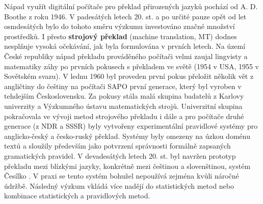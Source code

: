 \begin{multicols}{2}
Nápad využít digitální počítače pro překlad přirozených jazyků pochází od A. D. Boothe z roku 1946. V padesátých letech 20. st. a po určité pauze opět od let osmdesátých bylo do tohoto směru výzkumu investováno značné množství prostředků. I přesto \textbf{strojový překlad} (machine translation, MT) dodnes nesplňuje vysoká očekávání, jak byla formulována v prvních letech.
Na území České republiky nápad překladu prováděného počítači velmi zaujal lingvisty a matematiky záhy po prvních pokusech s překladem ve světě (1954 v USA, 1955 v Sovětském svazu). V lednu 1960 byl proveden první pokus přeložit několik vět z angličtiny do češtiny na počítači SAPO první generace, který byl vyroben v tehdejším Československu. Za pokusy stála malá skupina badatelů z Karlovy univerzity a Výzkumného ústavu matematických strojů. Univerzitní skupina pokračovala ve vývoji metod strojového překladu i dále a pro počítače druhé generace (z NDR a SSSR) byly vytvořeny experimentální pravidlové systémy pro anglicko-český a česko-ruský překlad. Systémy byly omezeny na úzkou doménu textů a sloužily především jako potvrzení správnosti formálně zapsaných gramatických pravidel. V devadesátých letech 20. st. byl navržen prototyp překladu mezi blízkými jazyky, konkrétně mezi češtinou a slovenštinou, systém Česílko \cite{Note18}. V praxi se tento systém bohužel nepoužívá zejména kvůli náročné údržbě. Následný výzkum vkládá více nadějí do statistických metod nebo kombinace statistických a pravidlových metod.



\end{multicols}
